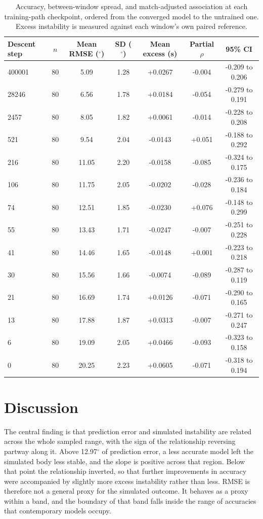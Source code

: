\documentclass[referee,lineno,pdflatex,sn-vancouver-num]{sn-jnl}
\begin{document}
\begin{table}[!htbp]
\caption{Accuracy, between-window spread, and match-adjusted association at each
training-path checkpoint, ordered from the converged model to the untrained one.
Excess instability is measured against each window's own paired reference.}\label{tab:checkpoints}
\begin{tabular}{lcccccc}
\toprule
Descent step & $n$ & Mean RMSE ($^{\circ}$) & SD ($^{\circ}$) & Mean excess (s) & Partial $\rho$ & 95\% CI \\
\midrule
400001 & 80 & 5.09 & 1.28 & +0.0267 & -0.004 & -0.209 to 0.206 \\
28246 & 80 & 6.56 & 1.78 & +0.0184 & -0.054 & -0.279 to 0.191 \\
2457 & 80 & 8.05 & 1.82 & +0.0061 & -0.014 & -0.228 to 0.208 \\
521 & 80 & 9.54 & 2.04 & -0.0143 & +0.051 & -0.188 to 0.292 \\
216 & 80 & 11.05 & 2.20 & -0.0158 & -0.085 & -0.324 to 0.175 \\
106 & 80 & 11.75 & 2.05 & -0.0202 & -0.028 & -0.236 to 0.184 \\
74 & 80 & 12.51 & 1.85 & -0.0230 & +0.076 & -0.148 to 0.299 \\
55 & 80 & 13.43 & 1.71 & -0.0247 & -0.007 & -0.251 to 0.228 \\
41 & 80 & 14.46 & 1.65 & -0.0148 & +0.001 & -0.223 to 0.218 \\
30 & 80 & 15.56 & 1.66 & -0.0074 & -0.089 & -0.287 to 0.119 \\
21 & 80 & 16.69 & 1.74 & +0.0126 & -0.071 & -0.290 to 0.165 \\
13 & 80 & 17.88 & 1.87 & +0.0313 & -0.007 & -0.271 to 0.247 \\
6 & 80 & 19.09 & 2.05 & +0.0466 & -0.093 & -0.323 to 0.158 \\
0 & 80 & 20.25 & 2.23 & +0.0605 & -0.071 & -0.318 to 0.194 \\
\bottomrule
\end{tabular}
\end{table}

\section{Discussion}\label{sec:discussion}

The central finding is that prediction error and simulated instability are
related across the whole sampled range, with the sign of the relationship
reversing partway along it. Above
12.97$^{\circ}$ of prediction
error, a less accurate model left the simulated body less stable, and the
slope is positive across that region. Below that point the
relationship inverted, so that further improvements in accuracy were accompanied by
slightly more excess instability rather than less. RMSE is therefore not a general
proxy for the simulated outcome. It behaves as a proxy within a band, and the boundary
of that band falls inside the range of accuracies that contemporary models occupy.
\end{document}
